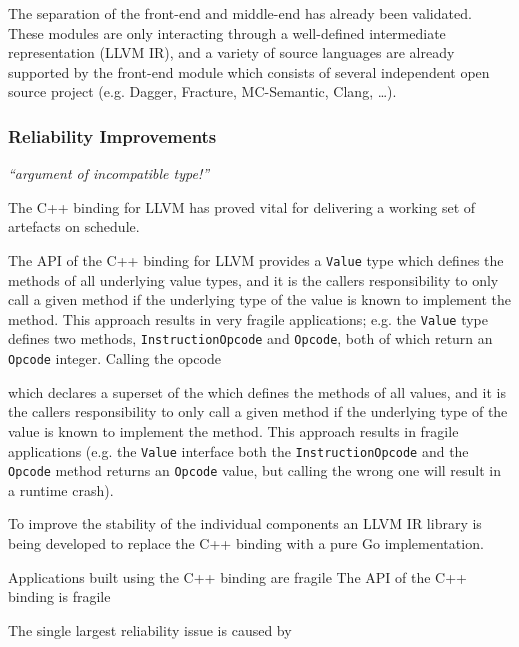 The separation of the front-end and middle-end has already been validated. These modules are only interacting through a well-defined intermediate representation (LLVM IR), and a variety of source languages are already supported by the front-end module which consists of several independent open source project (e.g. Dagger, Fracture, MC-Semantic, Clang, …).


\subsubsection{Reliability Improvements}

\textit{``argument of incompatible type!''}

The C++ binding for LLVM has proved vital for delivering a working set of artefacts on schedule.

The API of the C++ binding for LLVM provides a \texttt{Value} type which defines the methods of all underlying value types, and it is the callers responsibility to only call a given method if the underlying type of the value is known to implement the method. This approach results in very fragile applications; e.g. the \texttt{Value} type defines two methods, \texttt{InstructionOpcode} and \texttt{Opcode}, both of which return an \texttt{Opcode} integer. Calling the opcode

which declares a superset of the  which defines the methods of all values, and it is the callers responsibility to only call a given method if the underlying type of the value is known to implement the method. This approach results in fragile applications (e.g. the \texttt{Value} interface both the \texttt{InstructionOpcode} and the \texttt{Opcode} method returns an \texttt{Opcode} value, but calling the wrong one will result in a runtime crash).

To improve the stability of the individual components an LLVM IR library is being developed to replace the C++ binding with a pure Go implementation.

Applications built using the C++ binding are fragile The API of the C++ binding is fragile

The single largest reliability issue is caused by



